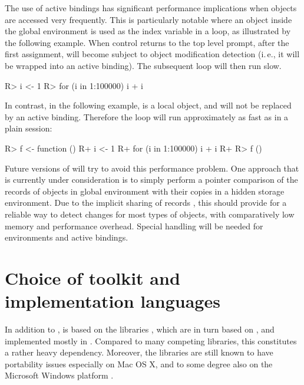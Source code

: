\documentclass[article,shortnames]{jss}
\begin{document}
The use of active bindings has significant performance implications when
objects are accessed very frequently. This is particularly notable where an
object inside the global environment is used as the index variable in a loop,
as illustrated by the following example. When control returns to the top level
prompt, after the first assignment,  will become subject to object modification
detection (i.\,e., it will be wrapped into an active
binding). The subsequent  loop will then run slow.

\begin{Code}
R> i <- 1
R> for (i in 1:100000) i + i
\end{Code}

In contrast, in the following example,  is a local object, and will not
be replaced by an active binding. Therefore the loop will run approximately as fast
as in a plain  session:

\begin{Code}
R> f <- function () {
R+    i <- 1
R+    for (i in 1:100000) i + i
R+ }
R> f ()
\end{Code}

Future versions of  will try to avoid this performance problem. 
One approach that is currently under consideration is to simply perform
a pointer comparison of the  records of objects in global environment with
their copies in a hidden storage environment. Due to the implicit sharing of
 records \citep{Rexts, Rinternals}, this should provide for a reliable
way to detect changes for most types of  objects, with comparatively low memory
and performance overhead. Special handling will be needed for environments and
active bindings.

\section{Choice of toolkit and implementation languages}
\label{sec:technical_toolkit}
In addition to ,  is based on the  libraries \citep{KDEmain}, which are in turn based
on  \citep{QTmain}, and implemented mostly in . Compared to many competing libraries,
this constitutes a rather heavy dependency. Moreover, the  libraries are
still known to have portability issues especially on Mac OS X, and to some degree
also on the Microsoft Windows platform \citep{Jarvis2010}.
\end{document}
